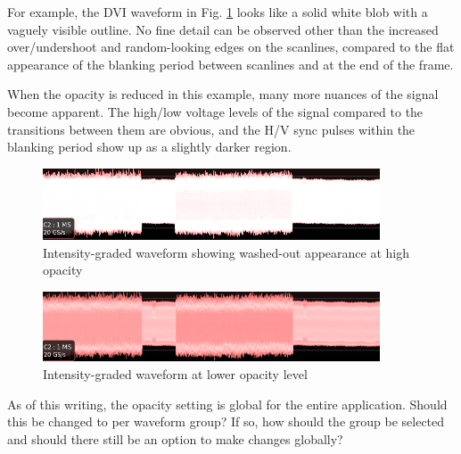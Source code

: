 For example, the DVI waveform in Fig. \ref{washedout-waveform} looks like a solid white blob with a vaguely visible
outline. No fine detail can be observed other than the increased over/undershoot and random-looking edges on the
scanlines, compared to the flat appearance of the blanking period between scanlines and at the end of the frame.

When the opacity is reduced in this example, many more nuances of the signal become apparent. The high/low voltage
levels of the signal compared to the transitions between them are obvious, and the H/V sync pulses within the blanking
period show up as a slightly darker region.

\begin{figure}[H]
\centering
\includegraphics[width=10cm]{images/washedout-waveform.png}
\caption{Intensity-graded waveform showing washed-out appearance at high opacity}
\label{washedout-waveform}
\end{figure}

\begin{figure}[H]
\centering
\includegraphics[width=10cm]{images/graded-waveform.png}
\caption{Intensity-graded waveform at lower opacity level}
\label{graded-waveform}
\end{figure}

As of this writing, the opacity setting is global for the entire application. Should this be changed to per waveform
group? If so, how should the group be selected and should there still be an option to make changes globally?
